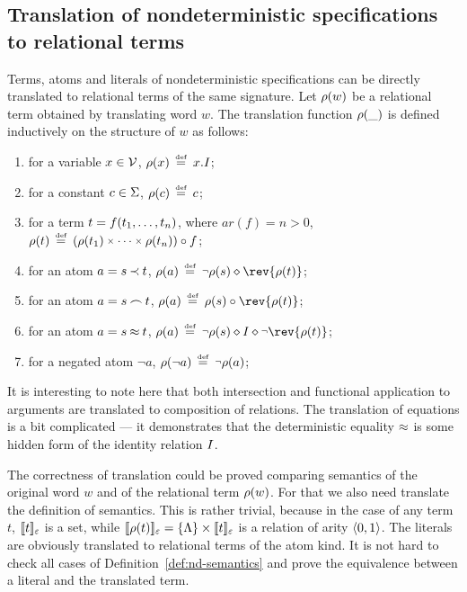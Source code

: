 \subsection{Translation of nondeterministic specifications \newline to
relational terms} \label {sec:transl-nds}

Terms, atoms and literals of nondeterministic specifications can be directly
translated to relational terms of the same signature. Let \(\transl w\) be a
relational term obtained by translating word $w$.  The translation function 
$\transl {\_}$ is
defined inductively on the structure of $w$ as follows:
\begin{enumerate}
\item for a variable \(x\in \Vars\), \(\transl x\Def x.I\);
\item for a constant \(c\in \Funcs\), \(\transl c\Def c\);
\item for a term \(t= f(\List tn,)\), where \(ar(f)=n>0\), \(\transl t\Def
(\transl {t_1}\pro \cdots \pro \transl {t_n})\comp f\); 
\item for an atom \(a=s\Incl t\), \(\transl a\Def \Neg\transl s\duck \rev 
{\transl t}\); 
\item for an atom \(a=s\Int t\), \(\transl a\Def \transl s\comp\rev {\transl t}\);
\item for an atom \(a=s\Eq t\), \(\transl a\Def \Neg\transl s\duck
\ident \duck\Neg\rev {\transl t}\);
\item for a negated atom $\neg a$, \(\transl {\neg a}\Def \Neg \transl a\);
\end{enumerate}

It is interesting to note here that both intersection and functional
application to arguments are translated to composition of relations.  The
translation of equations is a bit complicated --- it demonstrates
that the deterministic equality $\Eq$ is some hidden form of the identity
relation $\ident$.

The correctness of translation could be proved comparing semantics of the
original word $w$ and of the relational term \(\transl w\).  For that we also need
translate the definition of semantics.  This is rather trivial, because
in the case of any term $t$, \(\Value t\) is a set, while \(\Value {\transl
t}= \{\emseq\}\times \Value t\) is a relation of arity \(\<0,1\>\).  The
literals are obviously translated to relational terms of the atom kind.  It
is not hard to check all cases of Definition~\ref {def:nd-semantics} and
prove the equivalence between a literal and the translated term.


